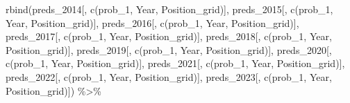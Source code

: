 \documentclass[
]{book}
\newenvironment{Shaded}{\begin{snugshade}}{\end{snugshade}}
\newcommand{\FunctionTok}[1]{\textcolor[rgb]{0.00,0.00,0.00}{#1}}
\newcommand{\NormalTok}[1]{#1}
\newcommand{\SpecialCharTok}[1]{\textcolor[rgb]{0.00,0.00,0.00}{#1}}
\newcommand{\StringTok}[1]{\textcolor[rgb]{0.31,0.60,0.02}{#1}}
\begin{document}
\begin{Shaded}
\begin{Highlighting}[]
\FunctionTok{rbind}\NormalTok{(preds\_2014[, }\FunctionTok{c}\NormalTok{(}\StringTok{\textquotesingle{}prob\_1\textquotesingle{}}\NormalTok{, }\StringTok{\textquotesingle{}Year\textquotesingle{}}\NormalTok{, }\StringTok{\textquotesingle{}Position\_grid\textquotesingle{}}\NormalTok{)], }
\NormalTok{      preds\_2015[, }\FunctionTok{c}\NormalTok{(}\StringTok{\textquotesingle{}prob\_1\textquotesingle{}}\NormalTok{, }\StringTok{\textquotesingle{}Year\textquotesingle{}}\NormalTok{, }\StringTok{\textquotesingle{}Position\_grid\textquotesingle{}}\NormalTok{)], }
\NormalTok{      preds\_2016[, }\FunctionTok{c}\NormalTok{(}\StringTok{\textquotesingle{}prob\_1\textquotesingle{}}\NormalTok{, }\StringTok{\textquotesingle{}Year\textquotesingle{}}\NormalTok{, }\StringTok{\textquotesingle{}Position\_grid\textquotesingle{}}\NormalTok{)], preds\_2017[, }\FunctionTok{c}\NormalTok{(}\StringTok{\textquotesingle{}prob\_1\textquotesingle{}}\NormalTok{, }\StringTok{\textquotesingle{}Year\textquotesingle{}}\NormalTok{, }\StringTok{\textquotesingle{}Position\_grid\textquotesingle{}}\NormalTok{)], preds\_2018[, }\FunctionTok{c}\NormalTok{(}\StringTok{\textquotesingle{}prob\_1\textquotesingle{}}\NormalTok{, }\StringTok{\textquotesingle{}Year\textquotesingle{}}\NormalTok{, }\StringTok{\textquotesingle{}Position\_grid\textquotesingle{}}\NormalTok{)],}
\NormalTok{      preds\_2019[, }\FunctionTok{c}\NormalTok{(}\StringTok{\textquotesingle{}prob\_1\textquotesingle{}}\NormalTok{, }\StringTok{\textquotesingle{}Year\textquotesingle{}}\NormalTok{, }\StringTok{\textquotesingle{}Position\_grid\textquotesingle{}}\NormalTok{)],}
\NormalTok{      preds\_2020[, }\FunctionTok{c}\NormalTok{(}\StringTok{\textquotesingle{}prob\_1\textquotesingle{}}\NormalTok{, }\StringTok{\textquotesingle{}Year\textquotesingle{}}\NormalTok{, }\StringTok{\textquotesingle{}Position\_grid\textquotesingle{}}\NormalTok{)], preds\_2021[, }\FunctionTok{c}\NormalTok{(}\StringTok{\textquotesingle{}prob\_1\textquotesingle{}}\NormalTok{, }\StringTok{\textquotesingle{}Year\textquotesingle{}}\NormalTok{, }\StringTok{\textquotesingle{}Position\_grid\textquotesingle{}}\NormalTok{)], }
\NormalTok{      preds\_2022[, }\FunctionTok{c}\NormalTok{(}\StringTok{\textquotesingle{}prob\_1\textquotesingle{}}\NormalTok{, }\StringTok{\textquotesingle{}Year\textquotesingle{}}\NormalTok{, }\StringTok{\textquotesingle{}Position\_grid\textquotesingle{}}\NormalTok{)], preds\_2023[, }\FunctionTok{c}\NormalTok{(}\StringTok{\textquotesingle{}prob\_1\textquotesingle{}}\NormalTok{, }\StringTok{\textquotesingle{}Year\textquotesingle{}}\NormalTok{, }\StringTok{\textquotesingle{}Position\_grid\textquotesingle{}}\NormalTok{)]) }\SpecialCharTok{\%\textgreater{}\%} 

\end{Highlighting}
\end{Shaded}
\end{document}
